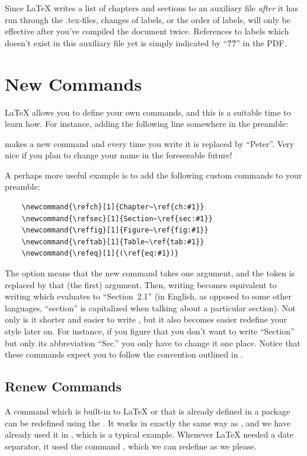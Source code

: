 {Since \LaTeX{} writes a list of chapters and sections to an auxiliary file \emph{after} it has run through the .tex-files, changes of labels, or the order of labels, will only be effective after you've compiled the document twice. References to labels which doesn't exist in this auxiliary file yet is simply indicated by ``\textbf{??}'' in the PDF.

\section{New Commands}\label{sec:latex:newcommand}
\index{\latexin{\newcommand}}
\LaTeX{} allows you to define your own commands, and this is a suitable time to learn how. For instance, adding the following line somewhere in the preamble:

\latexone{\newcommand{\myname}{Peter}}
\noindent makes a new command \latexin{\myname} and every time you write \latexin{\myname} it is replaced by ``Peter''. Very nice if you plan to change your name in the foreseeable future!

A perhaps more useful example is to add the following custom commands to your preamble:

\begin{verbatim}
	\newcommand{\refch}[1]{Chapter~\ref{ch:#1}}
	\newcommand{\refsec}[1]{Section~\ref{sec:#1}}
	\newcommand{\reffig}[1]{Figure~\ref{fig:#1}}
	\newcommand{\reftab}[1]{Table~\ref{tab:#1}}
	\newcommand{\refeq}[1]{(\ref{eq:#1})}
\end{verbatim}
The option \latexin{[1]} means that the new command takes one argument, and the token  is replaced by that (the first) argument. Then, writing  becomes equivalent to writing  which evaluates to ``Section~2.1'' (in English, as opposed to some other languages, ``section'' is capitalized when talking about a particular section). Not only is it shorter and easier to write , but it also becomes easier redefine your style later on. For instance, if you figure that you don't want to write ``Section'' but only its abbreviation ``Sec.'' you only have to change it one place. Notice that these commands expect you to follow the convention outlined in .

\subsection{Renew Commands}
\index{\latexin{\renewcommand}}
A command which is built-in to \LaTeX{} or that is already defined in a package can be redefined using the \latexin{\renewcommand}. It works in exactly the same way as \latexin{\newcommand}, and we have already used it in , which is a typical example. Whenever \LaTeX{} needed a date separator, it used the command \latexin{\dateseparator}, which we can redefine as we please.

}

